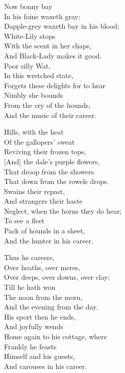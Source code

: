 \settowidth{\versewidth}{Dapple-grey waxeth bay in his blood;}
\begin{dcverse}\begin{patverse}
\vin Now bonny bay\\
In his foine waxeth gray;\\
Dapple-grey waxeth bay in his blood;\\
White-Lily stops\\
With the scent in her chaps,\\
And Black-Lady makes it good.\\
Poor silly Wat,\\
In this wretched state,\\
Forgets these delights for to hear\\
Nimbly she bounds\\
From the cry of the hounds,\\
And the music of their career.
\end{patverse}

\begin{patverse}
\vin Hills, with the heat\\
Of the gallopers’ sweat\\
Reviving their frozen tops,\\
{[And]} the dale’s purple flowers,\\
That droop from the showers\\
That down from the rowels drops.\\
Swains their repast,\\
And strangers their haste\\
Neglect, when the horns they do hear;\\
To see a fleet\\
Pack of hounds in a sheet,\\
And the hunter in his career.
\end{patverse}

\begin{patverse}
\vin Thus he careers,\\
Over heaths, over meres,\\
Over deeps, over downs, over clay;\\
Till he hath won\\
The noon from the morn,\\
And the evening from the day.\\
His sport then he ends,\\
And joyfully wends\\
Home again to his cottage, where\\
Frankly he feasts\\
Himself and his guests,\\
And carouses in his career.
\end{patverse}
\end{dcverse}
